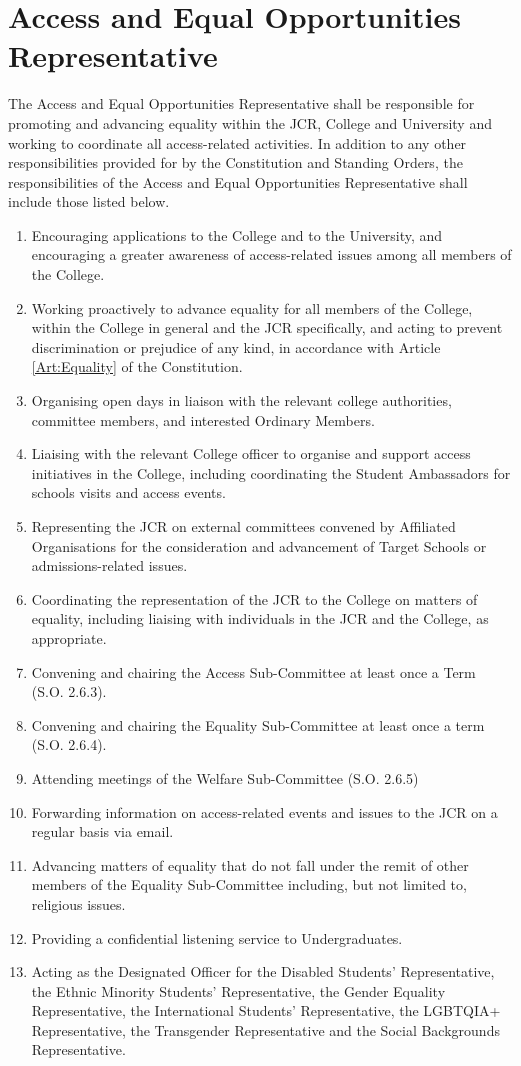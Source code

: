 \section{Access and Equal Opportunities Representative}
\npara The Access and Equal Opportunities Representative shall be responsible for promoting and advancing equality within the JCR, College and University and working to coordinate all access-related activities. 
\npara In addition to any other responsibilities provided for by the Constitution and Standing Orders, the responsibilities of the Access and Equal Opportunities Representative shall include those listed below.
\begin{enumerate}
	\item Encouraging applications to the College and to the University, and encouraging a greater awareness of access-related issues among all members of the College.     
	\item Working proactively to advance equality for all members of the College, within the College in general and the JCR specifically, and acting to prevent discrimination or prejudice of any kind, in accordance with Article \ref{Art:Equality} of the Constitution. 
	\item Organising open days in liaison with the relevant college authorities, committee members, and interested Ordinary Members.
	\item Liaising with the relevant College officer to organise and support access initiatives in the College, including coordinating the Student Ambassadors for schools visits and access events.
	\item Representing the JCR on external committees convened by Affiliated Organisations for the consideration and advancement of Target Schools or admissions-related issues.
	\item Coordinating the representation of the JCR to the College on matters of equality, including liaising with individuals in the JCR and the College, as appropriate.
	\item Convening and chairing the Access Sub-Committee at least once a Term (S.O. 2.6.3).
	\item Convening and chairing the Equality Sub-Committee at least once a term (S.O. 2.6.4).
	\item Attending meetings of the Welfare Sub-Committee (S.O. 2.6.5)     
	\item Forwarding information on access-related events and issues to the JCR on a regular basis via email. 
	\item Advancing matters of equality that do not fall under the remit of other members of the Equality Sub-Committee including, but not limited to, religious issues. 
	\item Providing a confidential listening service to Undergraduates.
	\item Acting as the Designated Officer for the Disabled Students’ Representative, the Ethnic Minority Students’ Representative, the Gender Equality Representative, the International Students’ Representative, the LGBTQIA+ Representative, the Transgender Representative and the Social Backgrounds Representative.
\end{enumerate}
